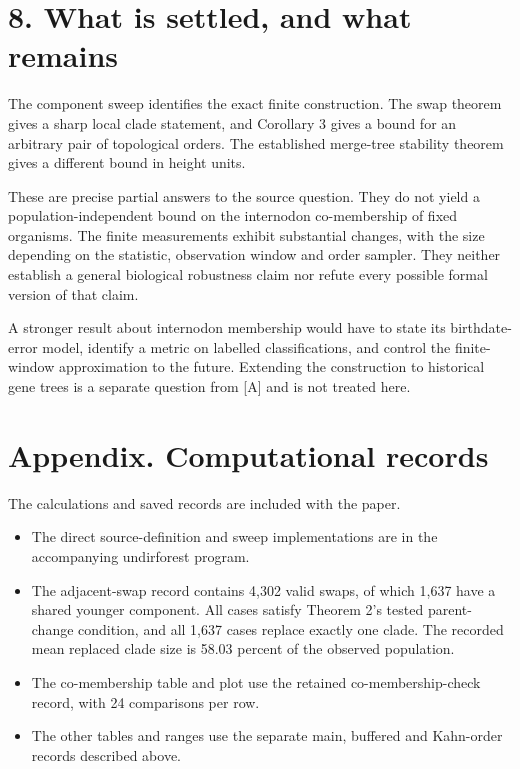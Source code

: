 \documentclass[
  11pt,
  letterpaper,
]{article}
\providecommand{\tightlist}{%
  \setlength{\itemsep}{0pt}\setlength{\parskip}{0pt}}
\begin{document}
\section{8. What is settled, and what
remains}\label{what-is-settled-and-what-remains}

The component sweep identifies the exact finite construction. The swap
theorem gives a sharp local clade statement, and Corollary 3 gives a
bound for an arbitrary pair of topological orders. The established
merge-tree stability theorem gives a different bound in height units.

These are precise partial answers to the source question. They do not
yield a population-independent bound on the internodon co-membership of
fixed organisms. The finite measurements exhibit substantial changes,
with the size depending on the statistic, observation window and order
sampler. They neither establish a general biological robustness claim
nor refute every possible formal version of that claim.

A stronger result about internodon membership would have to state its
birthdate-error model, identify a metric on labelled classifications,
and control the finite-window approximation to the future. Extending the
construction to historical gene trees is a separate question from
{[}A{]} and is not treated here.

\section{Appendix. Computational
records}\label{appendix.-computational-records}

The calculations and saved records are included with the paper.

\begin{itemize}
\tightlist
\item
  The direct source-definition and sweep implementations are in the
  accompanying undirforest program.
\item
  The adjacent-swap record contains 4,302 valid swaps, of which 1,637
  have a shared younger component. All cases satisfy Theorem 2's tested
  parent-change condition, and all 1,637 cases replace exactly one
  clade. The recorded mean replaced clade size is 58.03 percent of the
  observed population.
\item
  The co-membership table and plot use the retained co-membership-check
  record, with 24 comparisons per row.
\item
  The other tables and ranges use the separate main, buffered and
  Kahn-order records described above.
\end{itemize}
\end{document}
